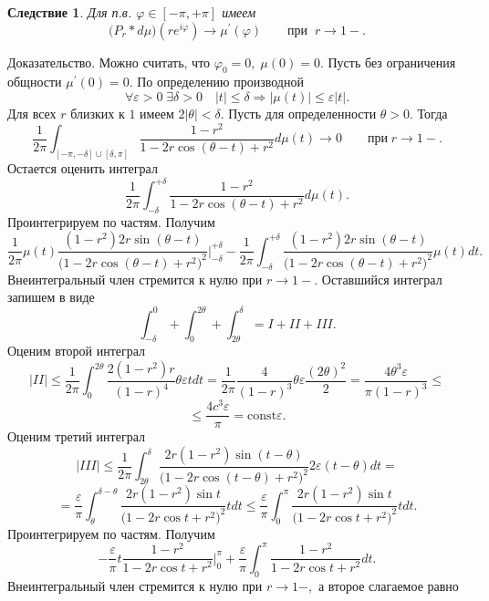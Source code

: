 \documentclass[12 pt, a4 paper]{article}
\theoremstyle{plain}   \newtheorem{Pro}{Задача}
\newtheorem{Cor}{Следствие}
\begin{document}
\begin{Cor}
Для п.в.
$ \varphi \in [-\pi , +\pi ] $
имеем
$$
  \biggl ( P_r \ast d\mu \biggr )
  (re^{i\varphi}) \longrightarrow
  \mu ^{\prime}(\varphi )
  \qquad при \; \; r \rightarrow 1- .
$$
\end{Cor}
{\Large Доказательство.}
Можно считать, что
$ \varphi _0 =0, \; \mu (0)=0. $
Пусть без ограничения общности
$ \mu ^{\prime}(0)=0. $
По определению производной
$$
  \forall \varepsilon >0 \; \exists \delta >0 \quad
  |t| \leq \delta \Rightarrow
  |\mu (t)| \leq \varepsilon |t|.
$$
Для всех
$ r $
близких к
$ 1 $
имеем
$ 2|\theta |<\delta . $
Пусть для определенности
$ \theta >0. $
Тогда
$$
  \frac{1}{2\pi} \int _{[-\pi , -\delta ] \cup [\delta , \pi]}
  \frac{1-r^2}{1-2r\cos (\theta -t)+r^2}d\mu (t)
  \longrightarrow 0 \qquad при \; r \rightarrow 1-.
$$
Остается оценить интеграл
$$
  \frac{1}{2\pi}\int _{-\delta}^{+\delta}
  \frac{1-r^2}{1-2r\cos (\theta -t)+r^2}d\mu (t).
$$
Проинтегрируем по частям. Получим
$$
  \frac{1}{2\pi}\mu (t)
  \frac{(1-r^2 )2r \sin (\theta -t)}
  {\bigl (1-2r\cos (\theta -t)+r^2 \bigr )^2}
  \Biggr | _{-\delta}^{+\delta}-
  \frac{1}{2\pi}\int _{-\delta}^{+\delta}
  \frac{(1-r^2 )2r \sin (\theta -t)}
  {\bigl (1-2r\cos (\theta -t)+r^2 \bigr )^2}
  \mu (t)dt.
$$
Внеинтегральный член стремится к нулю при
$ r \rightarrow 1- .$
Оставшийся интеграл запишем в виде
$$
  \int _{-\delta}^0 + \int _0 ^{2\theta} +
  \int _{2\theta}^{\delta} = I +II +III.
$$
Оценим второй интеграл
$$
  |II| \leq \frac{1}{2\pi}\int _0 ^{2\theta}
  \frac{2(1-r^2 )r}{(1-r)^4}\theta \varepsilon tdt=
  \frac{1}{2\pi}\frac{4}{(1-r)^3}\theta \varepsilon
  \frac{(2\theta)^2}{2}=
  \frac{4\theta ^3 \varepsilon}{\pi (1-r)^3} \leq
$$
$$
  \leq \frac{4c^3 \varepsilon }{\pi} = \mathrm{const} \varepsilon .
$$
Оценим третий интеграл
$$
  |III| \leq \frac{1}{2\pi} \int _{2\theta}^{\delta}
  \frac{2r(1-r^2 ) \sin (t-\theta )}
  {\bigl ( 1-2r \cos (t-\theta ) +r^2 \bigr ) ^2}
  2\varepsilon (t-\theta )dt=
$$
$$
  =\frac{\varepsilon}{\pi}\int _{\theta}^{\delta -\theta}
  \frac{2r(1-r^2 )\sin t}{\bigl (1-2r\cos t +r^2 \bigr ) ^2}tdt
  \leq \frac{\varepsilon}{\pi}\int _0 ^{\pi}
  \frac{2r(1-r^2 ) \sin t}
  {\bigl ( 1-2r\cos t +r^2 \bigr ) ^2}tdt.
$$
Проинтегрируем по частям. Получим
$$
  -\frac{\varepsilon}{\pi}t
  \frac{1-r^2}{1-2r\cos t +r^2 }
  \Biggr | _0 ^{\pi} + \frac{\varepsilon}{\pi}\int _0 ^{\pi}
  \frac{1-r^2}{1-2r\cos t +r^2 }dt.
$$
Внеинтегральный член стремится к нулю при
$ r \rightarrow 1- , $
а второе слагаемое равно
\end{document}

